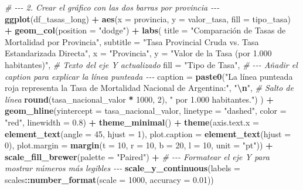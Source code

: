 \documentclass[
]{article}
\newenvironment{Shaded}{\begin{snugshade}}{\end{snugshade}}
\newcommand{\AttributeTok}[1]{\textcolor[rgb]{0.13,0.29,0.53}{#1}}
\newcommand{\CommentTok}[1]{\textcolor[rgb]{0.56,0.35,0.01}{\textit{#1}}}
\newcommand{\DecValTok}[1]{\textcolor[rgb]{0.00,0.00,0.81}{#1}}
\newcommand{\FloatTok}[1]{\textcolor[rgb]{0.00,0.00,0.81}{#1}}
\newcommand{\FunctionTok}[1]{\textcolor[rgb]{0.13,0.29,0.53}{\textbf{#1}}}
\newcommand{\NormalTok}[1]{#1}
\newcommand{\SpecialCharTok}[1]{\textcolor[rgb]{0.81,0.36,0.00}{\textbf{#1}}}
\newcommand{\StringTok}[1]{\textcolor[rgb]{0.31,0.60,0.02}{#1}}
\begin{document}
\begin{Shaded}
\begin{Highlighting}[]
\CommentTok{\# {-}{-}{-} 2. Crear el gráfico con las dos barras por provincia {-}{-}{-}}
\FunctionTok{ggplot}\NormalTok{(df\_tasas\_long) }\SpecialCharTok{+}
  \FunctionTok{aes}\NormalTok{(}\AttributeTok{x =}\NormalTok{ provincia, }\AttributeTok{y =}\NormalTok{ valor\_tasa, }\AttributeTok{fill =}\NormalTok{ tipo\_tasa) }\SpecialCharTok{+}
  \FunctionTok{geom\_col}\NormalTok{(}\AttributeTok{position =} \StringTok{"dodge"}\NormalTok{) }\SpecialCharTok{+}
  \FunctionTok{labs}\NormalTok{(}
    \AttributeTok{title =} \StringTok{"Comparación de Tasas de Mortalidad por Provincia"}\NormalTok{,}
    \AttributeTok{subtitle =} \StringTok{"Tasa Provincial Cruda vs. Tasa Estandarizada Directa"}\NormalTok{,}
    \AttributeTok{x =} \StringTok{"Provincia"}\NormalTok{,}
    \AttributeTok{y =} \StringTok{"Valor de la Tasa (por 1.000 habitantes)"}\NormalTok{, }\CommentTok{\# Texto del eje Y actualizado}
    \AttributeTok{fill =} \StringTok{"Tipo de Tasa"}\NormalTok{,}
    \CommentTok{\# {-}{-}{-} Añadir el caption para explicar la línea punteada {-}{-}{-}}
    \AttributeTok{caption =} \FunctionTok{paste0}\NormalTok{(}\StringTok{"La línea punteada roja representa la Tasa de Mortalidad Nacional de Argentina:"}\NormalTok{,}
                     \StringTok{"}\SpecialCharTok{\textbackslash{}n}\StringTok{"}\NormalTok{, }\CommentTok{\# Salto de línea}
                     \FunctionTok{round}\NormalTok{(tasa\_nacional\_valor }\SpecialCharTok{*} \DecValTok{1000}\NormalTok{, }\DecValTok{2}\NormalTok{), }\StringTok{" por 1.000 habitantes."}\NormalTok{)}
\NormalTok{  ) }\SpecialCharTok{+}
  \FunctionTok{geom\_hline}\NormalTok{(}\AttributeTok{yintercept =}\NormalTok{ tasa\_nacional\_valor, }\AttributeTok{linetype =} \StringTok{"dashed"}\NormalTok{, }\AttributeTok{color =} \StringTok{"red"}\NormalTok{, }\AttributeTok{linewidth =} \FloatTok{0.8}\NormalTok{) }\SpecialCharTok{+}
  \FunctionTok{theme\_minimal}\NormalTok{() }\SpecialCharTok{+}
  \FunctionTok{theme}\NormalTok{(}\AttributeTok{axis.text.x =} \FunctionTok{element\_text}\NormalTok{(}\AttributeTok{angle =} \DecValTok{45}\NormalTok{, }\AttributeTok{hjust =} \DecValTok{1}\NormalTok{),}
        \AttributeTok{plot.caption =} \FunctionTok{element\_text}\NormalTok{(}\AttributeTok{hjust =} \DecValTok{0}\NormalTok{),}
        \AttributeTok{plot.margin =} \FunctionTok{margin}\NormalTok{(}\AttributeTok{t =} \DecValTok{10}\NormalTok{, }\AttributeTok{r =} \DecValTok{10}\NormalTok{, }\AttributeTok{b =} \DecValTok{20}\NormalTok{, }\AttributeTok{l =} \DecValTok{10}\NormalTok{, }\AttributeTok{unit =} \StringTok{"pt"}\NormalTok{)) }\SpecialCharTok{+}
  \FunctionTok{scale\_fill\_brewer}\NormalTok{(}\AttributeTok{palette =} \StringTok{"Paired"}\NormalTok{) }\SpecialCharTok{+}
  \CommentTok{\# {-}{-}{-} Formatear el eje Y para mostrar números más legibles {-}{-}{-}}
  \FunctionTok{scale\_y\_continuous}\NormalTok{(}\AttributeTok{labels =}\NormalTok{ scales}\SpecialCharTok{::}\FunctionTok{number\_format}\NormalTok{(}\AttributeTok{scale =} \DecValTok{1000}\NormalTok{, }\AttributeTok{accuracy =} \FloatTok{0.01}\NormalTok{))}
\end{Highlighting}
\end{Shaded}
\end{document}
